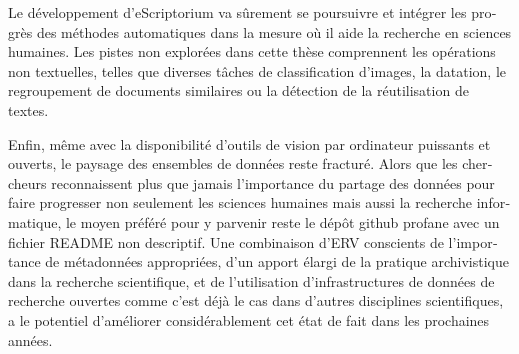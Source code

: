 \begin{french}
Le développement d'eScriptorium va sûrement se poursuivre et intégrer les
progrès des méthodes automatiques dans la mesure où il aide la recherche en
sciences humaines. Les pistes non explorées dans cette thèse comprennent les
opérations non textuelles, telles que diverses tâches de classification
d'images, la datation, le regroupement de documents similaires ou la détection
de la réutilisation de textes.

Enfin, même avec la disponibilité d'outils de vision par ordinateur puissants
et ouverts, le paysage des ensembles de données reste fracturé. Alors que les
chercheurs reconnaissent plus que jamais l'importance du partage des données
pour faire progresser non seulement les sciences humaines mais aussi la
recherche informatique, le moyen préféré pour y parvenir reste le dépôt github
profane avec un fichier README non descriptif. Une combinaison d'ERV conscients
de l'importance de métadonnées appropriées, d'un apport élargi de la pratique
archivistique dans la recherche scientifique, et de l'utilisation
d'infrastructures de données de recherche ouvertes comme c'est déjà le cas dans
d'autres disciplines scientifiques, a le potentiel d'améliorer considérablement
cet état de fait dans les prochaines années.

\end{french}


